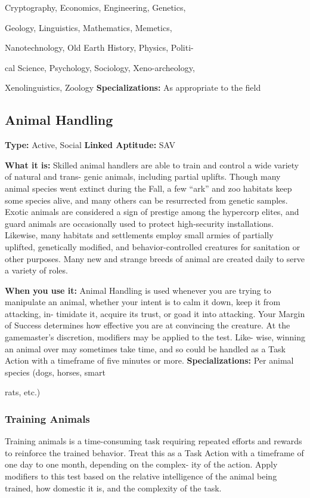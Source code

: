 Cryptography, Economics, Engineering, Genetics, 

Geology, Linguistics, Mathematics, Memetics, 

Nanotechnology, Old Earth History, Physics, Politi-

cal Science, Psychology, Sociology, Xeno-archeology, 

Xenolinguistics, Zoology
\textbf{Specializations:} As appropriate to the field

\subsection{Animal Handling}

\textbf{Type:} Active, Social
\textbf{Linked Aptitude:} SAV

\textbf{What it is:} Skilled animal handlers are able to 
train and control a wide variety of natural and trans-
genic animals, including partial uplifts. Though many 
animal species went extinct during the Fall, a few 
``ark'' and zoo habitats keep some species alive, and 
many others can be resurrected from genetic samples. 
Exotic animals are considered a sign of prestige 
among the hypercorp elites, and guard animals are 
occasionally used to protect high-security installations. 
Likewise, many habitats and settlements employ small 
armies of partially uplifted, genetically modified, and 
behavior-controlled creatures for sanitation or other 
purposes. Many new and strange breeds of animal are 
created daily to serve a variety of roles.

\textbf{When you use it:} Animal Handling is used whenever 
you are trying to manipulate an animal, whether your 
intent is to calm it down, keep it from attacking, in-
timidate it, acquire its trust, or goad it into attacking. 
Your Margin of Success determines how effective you 
are at convincing the creature. At the gamemaster's 
discretion, modifiers may be applied to the test. Like-
wise, winning an animal over may sometimes take 
time, and so could be handled as a Task Action with a 
timeframe of five minutes or more.
\textbf{Specializations:} Per animal species (dogs, horses, smart 

rats, etc.)

\subsubsection{Training Animals}

Training animals is a time-consuming task requiring 
repeated efforts and rewards to reinforce the trained 
behavior. Treat this as a Task Action with a timeframe 
of one day to one month, depending on the complex-
ity of the action. Apply modifiers to this test based on 
the relative intelligence of the animal being trained, 
how domestic it is, and the complexity of the task.

